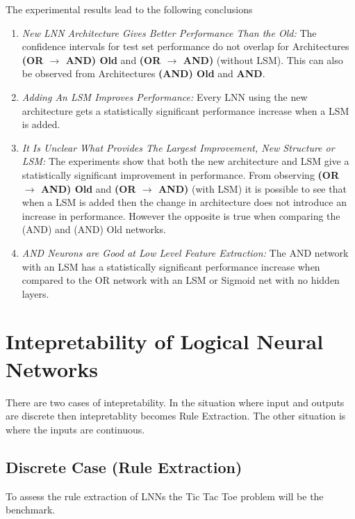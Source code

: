 The experimental results lead to the following conclusions
\begin{enumerate}
	\item \textit{New LNN Architecture Gives Better Performance Than the Old:} The confidence intervals for test set performance do not overlap for Architectures \textbf{(OR $\rightarrow$ AND) Old} and \textbf{(OR $\rightarrow$ AND)} (without LSM). This can also be observed from Architectures \textbf{(AND) Old} and \textbf{AND}.
	
	\item \textit{Adding An LSM Improves Performance:} Every LNN using the new architecture gets a statistically significant performance increase when a LSM is added.

	\item \textit{It Is Unclear What Provides The Largest Improvement, New Structure or LSM:} The experiments show that both the new architecture and LSM give a statistically significant improvement in performance. From observing \textbf{(OR $\rightarrow$ AND) Old} and \textbf{(OR $\rightarrow$ AND)} (with LSM) it is possible to see that when a LSM is added then the change in architecture does not introduce an increase in performance. However the opposite is true when comparing the (AND) and (AND) Old networks.
	
	\item \textit{AND Neurons are Good at Low Level Feature Extraction:} The AND network with an LSM has a statistically significant performance increase when compared to the OR network with an LSM or Sigmoid net with no hidden layers.
\end{enumerate}

\section{Intepretability of Logical Neural Networks}
There are two cases of intepretability. In the situation where input and outputs are discrete then intepretablity becomes Rule Extraction. The other situation is where the inputs are continuous.

\subsection{Discrete Case (Rule Extraction)}
To assess the rule extraction of LNNs the Tic Tac Toe  \cite{Lichman:2013} problem will be the benchmark. 


